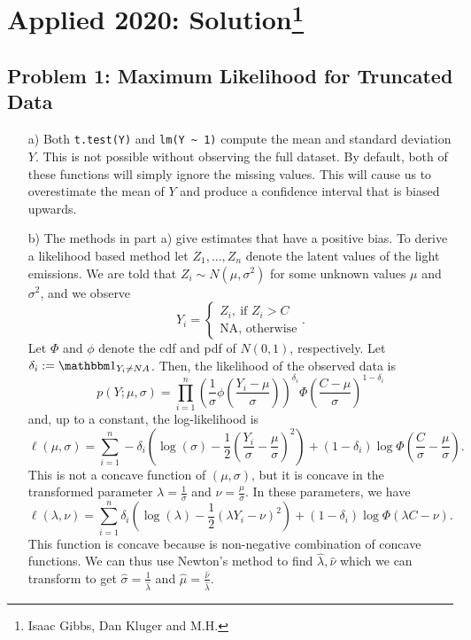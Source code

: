 \section{Applied 2020: Solution\footnote{Isaac Gibbs, Dan Kluger and M.H.}}

\subsection*{Problem 1: Maximum Likelihood for Truncated Data}

\begin{enumerate}
\item[a)]
Both \verb|t.test(Y)| and \verb|lm(Y ~ 1)| compute the mean and standard deviation $Y$. This is not possible without observing the full dataset. By default, both of these functions will simply ignore the missing values. This will cause us to overestimate the mean of $Y$ and produce a confidence interval that is biased upwards.
\item[b)]
The methods in part a) give estimates that have a positive bias. To derive a likelihood based method let $Z_1,\dots,Z_n$ denote the latent values of the light emissions. We are told that $Z_i \sim N(\mu,\sigma^2)$ for some unknown values $\mu$ and $\sigma^2$, and  we observe 
\[
Y_i = \begin{cases}
Z_i, \ \text{if } Z_i > C\\
\text{NA}, \text{ otherwise}
\end{cases}.
\] 
Let $\Phi$ and $\phi$ denote the cdf and pdf of $N(0,1)$, respectively. Let $\delta_i := \bone_{Y_i \neq NA}$. Then, the likelihood of the observed data is 
\[
p(Y;\mu,\sigma) = \prod_{i=1}^n \left( \frac{1}{\sigma} \phi\left( \frac{Y_i - \mu}{\sigma} \right) \right)^{\delta_i } \Phi\left( \frac{C - \mu}{\sigma} \right)^{1 - \delta_i} 
\]
and, up  to a constant, the log-likelihood is
\[\ell(\mu,\sigma) = \sum_{i=1}^n -\delta_i\left(\log(\sigma) -\frac{1}{2}\left(\frac{Y_i}{\sigma}-\frac{\mu}{\sigma}\right)^2\right) + (1-\delta_i)\log \Phi\left(\frac{C}{\sigma}-\frac{\mu}{\sigma}\right). \]
This is not a concave function of $(\mu,\sigma)$, but it is concave in the transformed parameter $\lambda = \frac{1}{\sigma}$ and $\nu = \frac{\mu}{\sigma}$. In these parameters, we have
\[\ell(\lambda,\nu) =\sum_{i=1}^n \delta_i\left(\log(\lambda) -\frac{1}{2}\left(\lambda Y_i-\nu\right)^2\right) + (1-\delta_i)\log \Phi\left(\lambda C-\nu\right). \]
This function is concave because is non-negative combination of concave functions. We can thus use Newton's method to find $\hat{\lambda},\hat{\nu}$ which we can transform to get $\hat{\sigma} = \frac{1}{\hat{\lambda}}$ and $\hat{\mu} = \frac{\hat{\nu}}{\hat{\lambda}}$.



\end{enumerate}
